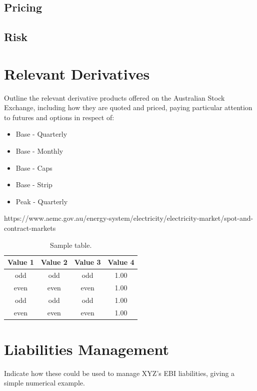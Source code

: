 \documentclass[12pt]{article}
\begin{document}
\lipsum[1]

\subsection{Pricing}
\lipsum[1]

\subsection{Risk}
\lipsum[1]


\section{Relevant Derivatives}
Outline the relevant derivative products offered on the Australian Stock Exchange, including how they are quoted and priced, paying particular attention to futures and options in respect of: 
\begin{itemize}
 \item Base - Quarterly
 \item Base - Monthly
 \item Base - Caps
 \item Base - Strip
 \item Peak - Quarterly
\end{itemize}
https://www.aemc.gov.au/energy-system/electricity/electricity-market/spot-and-contract-markets

\begin{table}[!h]
\centering
\caption{Sample table.}
\begin{tabular}{cccc}
\toprule
Value 1 & Value 2 & Value 3 & Value 4\\
\midrule
 odd     & odd   & odd & 1.00 \\
 even    & even  & even& 1.00 \\
 odd     & odd   & odd & 1.00 \\
 even    & even  & even& 1.00 \\
\bottomrule
\end{tabular}
\end{table}

\section{Liabilities Management}
Indicate how these could be used to manage XYZ’s EBI liabilities, giving a simple numerical example. \par
\end{document}
